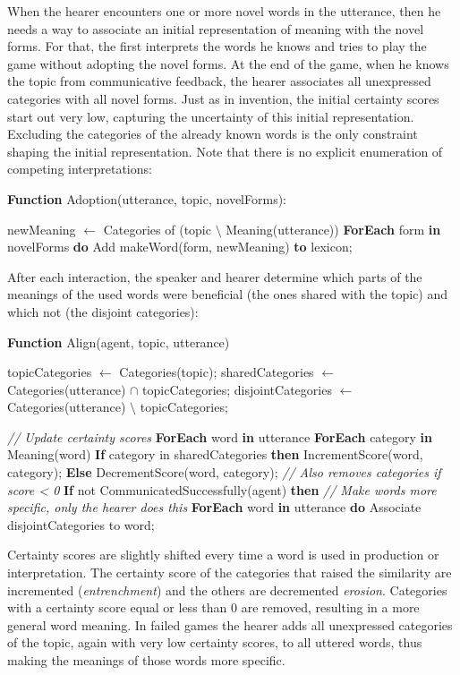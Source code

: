  When the hearer encounters one or more novel
words in the utterance, then he needs a way to associate an initial
representation of meaning with the novel forms. For that, the first
interprets the words he knows and tries to play the game without
adopting the novel forms. At the end of the game, when he knows the
topic from communicative feedback, the hearer associates all
unexpressed categories with all novel forms. Just as in invention, the
initial certainty scores start out very low, capturing the uncertainty
of this initial representation. Excluding the categories of the
already known words is the only constraint shaping the initial
representation. Note that there is no explicit enumeration of
competing interpretations:

\begin{verbatim+}
\textbf{Function} Adoption(utterance, topic, novelForms):

newMeaning $\leftarrow$ Categories of (topic $\setminus$  Meaning(utterance))
\textbf{ForEach} form \textbf{in} novelForms \textbf{do} 
    Add makeWord(form, newMeaning) \textbf{to} lexicon; 
\end{verbatim+}


 After each interaction, the speaker and hearer
determine which parts of the meanings of the used words were
beneficial (the ones shared with the topic) and which not (the
disjoint categories): 

\begin{verbatim+}
\textbf{Function} Align(agent, topic, utterance)

topicCategories $\leftarrow$ Categories(topic);
sharedCategories $\leftarrow$ Categories(utterance) $\cap$ topicCategories;
disjointCategories $\leftarrow$ Categories(utterance) $\setminus$ topicCategories;
 
\textit{// Update certainty scores}
\textbf{ForEach} word \textbf{in} utterance 
   \textbf{ForEach} category \textbf{in} Meaning(word) 
      \textbf{If} category in sharedCategories
      \textbf{then} IncrementScore(word, category);
      \textbf{Else} DecrementScore(word, category); \textit{// Also removes categories if score < 0} 
\textbf{If} not CommunicatedSuccessfully(agent) 
\textbf{then} \textit{// Make words more specific, only the hearer does this} 
   \textbf{ForEach} word \textbf{in} utterance 
      \textbf{do} Associate disjointCategories to word;
\end{verbatim+}

Certainty scores are slightly shifted every time a word is used in
production or interpretation. The certainty score of the categories
that raised the similarity are incremented (\emph{entrenchment}) and
the others are decremented \emph{erosion}. Categories with a certainty
score equal or less than 0 are removed, resulting in a more general
word meaning. In failed games the hearer adds all unexpressed
categories of the topic, again with very low certainty scores, to all
uttered words, thus making the meanings of those words more specific.



